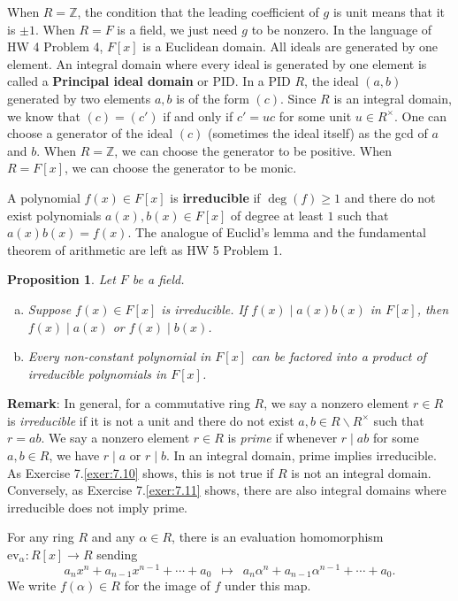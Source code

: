 \documentclass{article}
\def\Z{{\mathbb Z}}
\def\Z{{\mathbb Z}}
\newtheorem{proposition}[subsection]{Proposition}
\begin{document}
When $R = \Z$, the condition that the leading coefficient of $g$ is unit means that it is $\pm1$. When $R = F$ is a field, we just need $g$ to be nonzero. In the language of HW 4 Problem 4, $F[x]$ is a Euclidean domain. All ideals are generated by one element. An integral domain where every ideal is generated by one element is called a \textbf{Principal ideal domain} or PID. In a PID $R$, the ideal $(a,b)$ generated by two elements $a,b$ is of the form $(c)$. Since $R$ is an integral domain, we know that $(c) = (c')$ if and only if $c' = uc$ for some unit $u\in R^\times$. One can choose a generator of the ideal $(c)$ (sometimes the ideal itself) as the gcd of $a$ and $b$. When $R = \Z$, we can choose the generator to be positive. When $R = F[x]$, we can choose the generator to be monic.


A polynomial $f(x)\in F[x]$ is \textbf{irreducible} if $\deg(f)\geq1$ and there do not exist polynomials $a(x),b(x)\in F[x]$ of degree at least $1$ such that $a(x)b(x) = f(x)$. The analogue of Euclid's lemma and the fundamental theorem of arithmetic are left as HW 5 Problem 1.
\begin{proposition}
    Let $F$ be a field.
    \begin{enumerate}[(a)]
        \item Suppose $f(x)\in F[x]$ is irreducible. If $f(x)\mid a(x)b(x)$ in $F[x]$, then $f(x)\mid a(x)$ or $f(x)\mid b(x)$.
        \item Every non-constant polynomial in $F[x]$ can be factored into a product of irreducible polynomials in $F[x]$.
    \end{enumerate}
\end{proposition}

\noindent\textbf{Remark}: In general, for a commutative ring $R$, we say a nonzero element $r\in R$ is \textit{irreducible} if it is not a unit and there do not exist $a,b\in R\backslash R^\times$ such that $r = ab$. We say a nonzero element $r\in R$ is \textit{prime} if whenever $r\mid ab$ for some $a,b\in R$, we have $r\mid a$ or $r\mid b$. In an integral domain, prime implies irreducible. As Exercise 7.\ref{exer:7.10} shows, this is not true if $R$ is not an integral domain. Conversely, as Exercise 7.\ref{exer:7.11} shows, there are also integral domains where irreducible does not imply prime. 

\vspace{5pt}

For any ring $R$ and any $\alpha\in R$, there is an evaluation homomorphism $\text{ev}_\alpha:R[x]\rightarrow R$ sending $$a_nx^n + a_{n-1}x^{n-1} + \cdots + a_0\,\,\, \mapsto \,\,\,a_n\alpha^n + a_{n-1}\alpha^{n-1} + \cdots + a_0.$$
We write $f(\alpha)\in R$ for the image of $f$ under this map.
\end{document}
